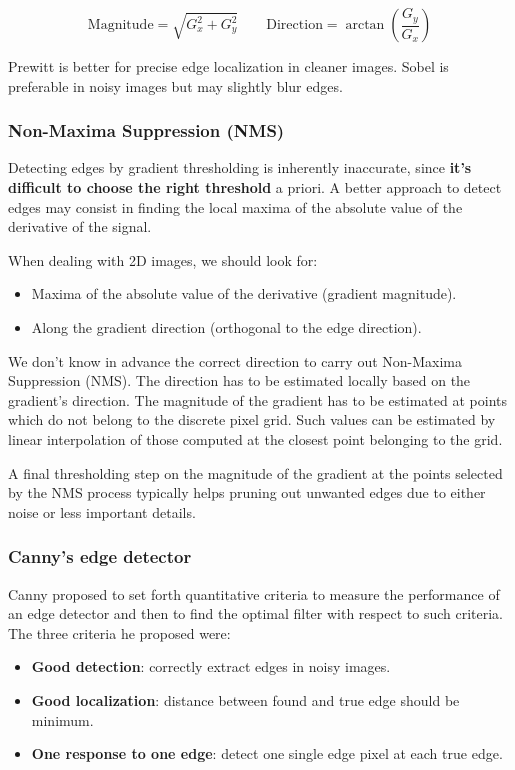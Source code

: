 $$\text{Magnitude} = \sqrt{G_x^2 + G_y^2} \quad\quad \text{Direction} = \arctan(\frac{G_y}{G_x})$$

Prewitt is better for precise edge localization in cleaner images.
Sobel is preferable in noisy images but may slightly blur edges.


\subsubsection{Non-Maxima Suppression (NMS)}

Detecting edges by gradient thresholding is inherently inaccurate, since \textbf{it's difficult to choose the right threshold} a priori.
A better approach to detect edges may consist in finding the local maxima of the absolute value of the derivative of the signal.

When dealing with 2D images, we should look for:
\begin{itemize}
  \item Maxima of the absolute value of the derivative (gradient magnitude).
  \item Along the gradient direction (orthogonal to the edge direction).
\end{itemize}

We don't know in advance the correct direction to carry out Non-Maxima Suppression (NMS).
The direction has to be estimated locally based on the gradient's direction.
The magnitude of the gradient has to be estimated at points which do not belong to the discrete pixel grid.
Such values can be estimated by linear interpolation of those computed at the closest point belonging to the grid.

A final thresholding step on the magnitude of the gradient at the points selected by the NMS process typically helps pruning out unwanted edges due to either noise or less important details.

\subsubsection{Canny's edge detector}
Canny proposed to set forth quantitative criteria to measure the performance of an edge detector and then to find the optimal filter with respect to such criteria.
The three criteria he proposed were:
\begin{itemize}
  \item \textbf{Good detection}: correctly extract edges in noisy images.
  \item \textbf{Good localization}: distance between found and true edge should be minimum.
  \item \textbf{One response to one edge}: detect one single edge pixel at each true edge.
\end{itemize}

